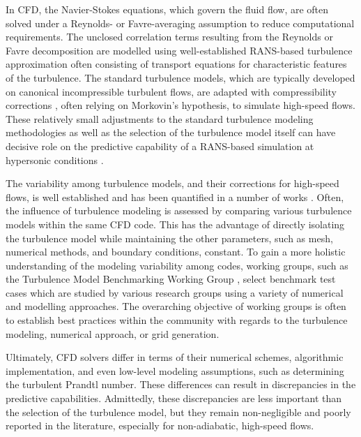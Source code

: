 \documentclass[journal ]{new-aiaa}
\begin{document}
In CFD, the Navier-Stokes equations, which govern the fluid flow, are often solved under a Reynolds- or Favre-averaging assumption to reduce computational requirements. The unclosed correlation terms resulting from the Reynolds or Favre decomposition are modelled using well-established RANS-based turbulence approximation often consisting of transport equations for characteristic features of the turbulence. The standard turbulence models, which are typically developed on canonical incompressible turbulent flows, are adapted with compressibility corrections  \cite{Rumsey2009,Tang2015,Zhu2020}, often relying on Morkovin's hypothesis, to simulate high-speed flows. These relatively small adjustments to the standard turbulence modeling methodologies as well as the selection of the turbulence model itself can have decisive role on the predictive capability of a RANS-based simulation at hypersonic conditions \cite{Tang2015,Zhu2020}.


The variability among turbulence models, and their corrections for high-speed flows, is well established and has been quantified in a number of works \cite{Tang2015,Huang2020,Zhu2020}. Often, the influence of turbulence modeling is assessed by comparing various turbulence models within the  same CFD code. This has the advantage of directly isolating the turbulence model while maintaining the other parameters, such as mesh, numerical methods, and boundary conditions, constant. To gain a more holistic understanding of the modeling variability among codes,  working groups, such as the Turbulence Model Benchmarking Working Group \cite{Rumsey2014, RumseyBenchmarking}, select benchmark test cases which are studied by various research groups using a variety of numerical and modelling approaches. The overarching objective of working groups is often to establish best practices within the community with regards to the turbulence modeling, numerical approach, or grid generation.

Ultimately, CFD solvers differ in terms of their numerical schemes, algorithmic implementation, and even low-level modeling assumptions, such as determining the turbulent Prandtl number. These differences can result in discrepancies in the predictive capabilities. Admittedly, these discrepancies are less important than the selection of the turbulence model, but they remain non-negligible and poorly reported in the literature, especially for non-adiabatic, high-speed flows. 
\end{document}
